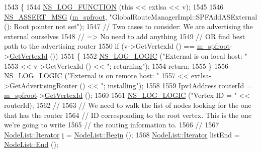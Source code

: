 \begin{DoxyCode}
1543 \{
1544   \hyperlink{log-macros-disabled_8h_a90b90d5bad1f39cb1b64923ea94c0761}{NS\_LOG\_FUNCTION} (\textcolor{keyword}{this} << extlsa << v);
1545 
1546   \hyperlink{assert_8h_aff5ece9066c74e681e74999856f08539}{NS\_ASSERT\_MSG} (\hyperlink{classns3_1_1GlobalRouteManagerImpl_a977f6b62ef1f1b58d041a2f49c093a1c}{m\_spfroot}, \textcolor{stringliteral}{"GlobalRouteManagerImpl::SPFAddASExternal (): Root
       pointer not set"});
1547 \textcolor{comment}{// Two cases to consider: We are advertising the external ourselves}
1548 \textcolor{comment}{// => No need to add anything}
1549 \textcolor{comment}{// OR find best path to the advertising router}
1550   \textcolor{keywordflow}{if} (v->GetVertexId () == \hyperlink{classns3_1_1GlobalRouteManagerImpl_a977f6b62ef1f1b58d041a2f49c093a1c}{m\_spfroot}->\hyperlink{classns3_1_1SPFVertex_addc1067d86f26e9fe3b2e34ed16f929c}{GetVertexId} ())
1551     \{
1552       \hyperlink{group__logging_ga88acd260151caf2db9c0fc84997f45ce}{NS\_LOG\_LOGIC} (\textcolor{stringliteral}{"External is on local host: "} 
1553                     << v->GetVertexId () << \textcolor{stringliteral}{"; returning"});
1554       \textcolor{keywordflow}{return};
1555     \}
1556   \hyperlink{group__logging_ga88acd260151caf2db9c0fc84997f45ce}{NS\_LOG\_LOGIC} (\textcolor{stringliteral}{"External is on remote host: "} 
1557                 << extlsa->GetAdvertisingRouter () << \textcolor{stringliteral}{"; installing"});
1558 
1559   Ipv4Address routerId = \hyperlink{classns3_1_1GlobalRouteManagerImpl_a977f6b62ef1f1b58d041a2f49c093a1c}{m\_spfroot}->\hyperlink{classns3_1_1SPFVertex_addc1067d86f26e9fe3b2e34ed16f929c}{GetVertexId} ();
1560 
1561   \hyperlink{group__logging_ga88acd260151caf2db9c0fc84997f45ce}{NS\_LOG\_LOGIC} (\textcolor{stringliteral}{"Vertex ID = "} << routerId);
1562 \textcolor{comment}{//}
1563 \textcolor{comment}{// We need to walk the list of nodes looking for the one that has the router}
1564 \textcolor{comment}{// ID corresponding to the root vertex.  This is the one we're going to write}
1565 \textcolor{comment}{// the routing information to.}
1566 \textcolor{comment}{//}
1567   \hyperlink{classns3_1_1NodeList_a9e2679a94efb4f0066cc21e65440364d}{NodeList::Iterator} \hyperlink{bernuolliDistribution_8m_a6f6ccfcf58b31cb6412107d9d5281426}{i} = \hyperlink{classns3_1_1NodeList_a93d2211831f5cb71d1dbb721e2721d7f}{NodeList::Begin} (); 
1568   \hyperlink{classns3_1_1NodeList_a9e2679a94efb4f0066cc21e65440364d}{NodeList::Iterator} listEnd = \hyperlink{classns3_1_1NodeList_a027a558c16e6078e25c7ffc67becb559}{NodeList::End} ();

\end{DoxyCode}
